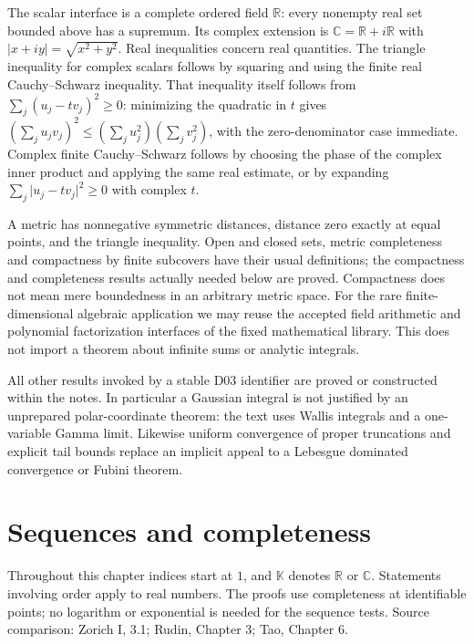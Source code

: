 \documentclass[11pt,oneside,a4paper]{book}
\theoremstyle{definition}
\theoremstyle{remark}
\newcommand{\R}{\mathbb R}
\newcommand{\C}{\mathbb C}
\newcommand{\K}{\mathbb K}
\newcommand{\abs}[1]{\lvert#1\rvert}
\newcommand{\SourceRef}[1]{{\small\textsf{Source comparison: #1.}}}
\begin{document}
The scalar interface is a complete ordered field $\R$: every nonempty real set
bounded above has a supremum. Its complex extension is $\C=\R+i\R$ with
$\abs{x+iy}=\sqrt{x^2+y^2}$. Real inequalities concern real quantities. The
triangle inequality for complex scalars follows by squaring and using the finite
real Cauchy--Schwarz inequality. That inequality itself follows from
$\sum_j(u_j-tv_j)^2\geq0$: minimizing the quadratic in $t$ gives
$(\sum_j u_jv_j)^2\leq(\sum_j u_j^2)(\sum_jv_j^2)$, with the zero-denominator
case immediate. Complex finite Cauchy--Schwarz follows by choosing the phase of
the complex inner product and applying the same real estimate, or by expanding
$\sum_j\abs{u_j-tv_j}^2\geq0$ with complex $t$.

A metric has nonnegative symmetric distances, distance zero exactly at equal
points, and the triangle inequality. Open and closed sets, metric completeness
and compactness by finite subcovers have their usual definitions; the compactness
and completeness results actually needed below are proved. Compactness does not
mean mere boundedness in an arbitrary metric space. For the rare finite-dimensional
algebraic application we may reuse the accepted field arithmetic and polynomial
factorization interfaces of the fixed mathematical library. This does not import
a theorem about infinite sums or analytic integrals.

All other results invoked by a stable D03 identifier are proved or constructed
within the notes. In particular a Gaussian integral is not justified by an
unprepared polar-coordinate theorem: the text uses Wallis integrals and a
one-variable Gamma limit. Likewise uniform convergence of proper truncations
and explicit tail bounds replace an implicit appeal to a Lebesgue dominated
convergence or Fubini theorem.

\chapter{Sequences and completeness}
Throughout this chapter indices start at $1$, and $\K$ denotes $\R$ or $\C$. Statements involving order apply to real numbers. The proofs use completeness at identifiable points; no logarithm or exponential is needed for the sequence tests.
\SourceRef{Zorich I, 3.1; Rudin, Chapter 3; Tao, Chapter 6}
\end{document}
